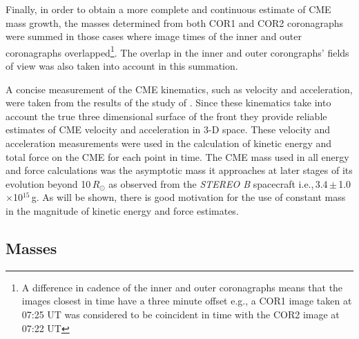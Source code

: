 Finally, in order to obtain a more complete and continuous estimate of CME mass growth, the masses determined from both COR1 and COR2 
coronagraphs were summed in those cases where image times of the inner and outer coronagraphs overlapped\footnote{A difference in cadence of 
the inner and outer coronagraphs means that the images closest in time have a three minute offset e.g., a COR1 image taken at 07:25 UT was 
considered to be coincident in time with the COR2 image at 07:22 UT}. The overlap in the inner and outer corongraphs' fields of view was also 
taken into account in this summation.


A concise measurement of the CME kinematics, such as velocity and acceleration, were taken from the results of the study of \citet{byr10}. Since 
these kinematics take into account the true three dimensional surface of the front they provide reliable estimates of CME velocity and acceleration 
in 3-D space. These velocity and acceleration measurements were used in the calculation of kinetic energy and total force on the CME for each 
point in time. The CME mass used in all energy and force calculations was the asymptotic mass it approaches at later stages of its evolution 
beyond 10\,$R_{\odot}$ as observed from the \emph{STEREO B} spacecraft i.e.,\,3.4\,$\pm$\,1.0$\times$10$^{15}$\,g. As will be shown, there is 
good motivation for the use of constant mass in the magnitude of kinetic energy and force estimates. 


\subsection{Masses}\label{sec:11}

